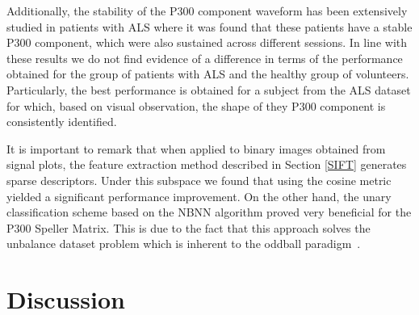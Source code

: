 \documentclass[utf8]{frontiersSCNS} %
\begin{document}
Additionally, the stability of the P300 component waveform has been extensively studied in patients with ALS \citep{SellersandEmanuelDonchin2006,TomohiroMadarame2008,Nijboer2009,Mak2012,McCane2015} where it was found that these patients have a stable P300 component, which were also sustained across different sessions.  In line with these results we do not find evidence of a difference in terms of the performance obtained for the group of patients with ALS and the healthy group of volunteers. Particularly, the best performance is obtained for a subject from the ALS dataset for which, based on visual observation, the shape of they P300 component is consistently identified.


It is important to remark that when applied to binary images obtained from signal plots, the feature extraction method described in Section \ref{SIFT} generates sparse descriptors.  Under this subspace we found that using the cosine metric yielded a significant performance improvement. On the other hand, the unary classification scheme based on the NBNN algorithm proved very beneficial for the P300 Speller Matrix.  This is due to the fact that this approach solves the unbalance dataset problem which is inherent to the oddball paradigm~\citep{Tibon2015}.  


\section{Discussion}
\label{discussion}

\end{document}
